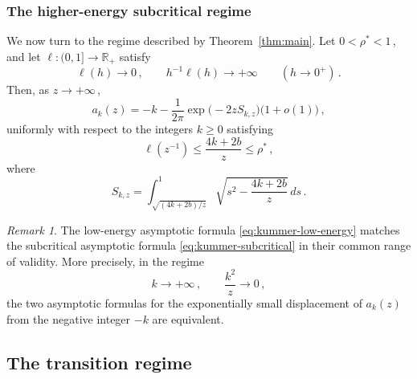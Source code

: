 \documentclass[11pt]{amsart}
\numberwithin{equation}{section}
\theoremstyle{remark}
\newtheorem{remark}[theorem]{Remark}
\begin{document}
\subsubsection{The higher-energy subcritical regime}

We now turn to the regime described by Theorem~\ref{thm:main}.
Let $0<\rho^*<1$\,, and let $\ell:(0,1]\to\mathbb R_+$ satisfy
\begin{equation}
\ell(h)\longrightarrow0\,,
\qquad
h^{-1}\ell(h)\longrightarrow+\infty
\qquad
(h\to0^+)\,.
\end{equation}
Then, as $z\to+\infty\,$,
\begin{equation}\label{eq:kummer-subcritical}
	a_k(z)
	=
	-k-\frac{1}{2\pi}
	\exp\bigl(-2z S_{k,z}\bigr)
	\bigl(1+o(1)\bigr)\,,
\end{equation}
uniformly with respect to the integers $k\geq0$ satisfying
\begin{equation}\label{eq:kummer-subcritical-range}
	\ell(z^{-1})
	\leq
	\frac{4k+2b}{z}
	\leq
	\rho^*\,,
\end{equation}
where
\begin{equation}\label{eq:Skz}
	S_{k,z}
	=
	\int_{\sqrt{(4k+2b)/z}}^1
	\sqrt{s^2-\frac{4k+2b}{z}}\,ds\,.
\end{equation}

\begin{remark}
	The low-energy asymptotic formula \eqref{eq:kummer-low-energy} matches
	the subcritical asymptotic formula \eqref{eq:kummer-subcritical} in
	their common range of validity. More precisely, in the regime
	\[
	k\to+\infty\,,
	\qquad
	\frac{k^2}{z}\to0\,,
	\]
	the two asymptotic formulas for the exponentially small displacement
	of $a_k(z)$ from the negative integer $-k$ are equivalent.
\end{remark}


\subsection{The transition regime}
\end{document}
